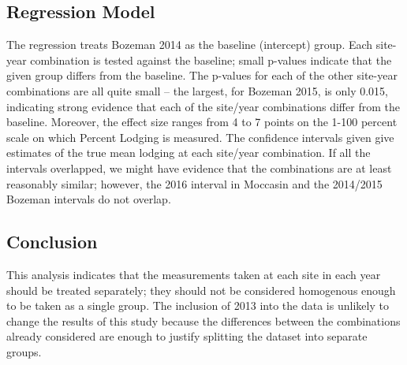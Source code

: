 \documentclass[11pt]{article}\usepackage[]{graphicx}\usepackage[]{color}
\makeatletter
\newenvironment{kframe}{%
 \def\at@end@of@kframe{}%
 \ifinner\ifhmode%
  \def\at@end@of@kframe{\end{minipage}}%
  \begin{minipage}{\columnwidth}%
 \fi\fi%
 \def\FrameCommand##1{\hskip\@totalleftmargin \hskip-\fboxsep
 \colorbox{shadecolor}{##1}\hskip-\fboxsep
     \hskip-\linewidth \hskip-\@totalleftmargin \hskip\columnwidth}%
 \MakeFramed {\advance\hsize-\width
   \@totalleftmargin\z@ \linewidth\hsize
   \@setminipage}}%
 {\par\unskip\endMakeFramed%
 \at@end@of@kframe}
\newenvironment{knitrout}{}{} %
\makeatother
\begin{document}
\subsection{Regression Model}
  The regression treats Bozeman 2014 as the baseline (intercept) group. Each site-year combination is tested against the   baseline; small p-values indicate that the given group differs from the baseline. The p-values for each of the other site-year combinations are all quite small – the largest, for Bozeman 2015, is only 0.015, indicating strong evidence that each of the site/year combinations differ from the baseline. Moreover, the effect size ranges from 4 to 7 points on the 1-100 percent scale on which Percent Lodging is measured.  The confidence intervals given give estimates of the true mean lodging at each site/year combination. If all the intervals overlapped, we might have evidence that the combinations are at least reasonably similar; however, the 2016 interval in Moccasin and the 2014/2015 Bozeman intervals do not overlap. 



\begin{knitrout}\footnotesize
{}\color{fgcolor}\begin{kframe}


{\ttfamily\noindent\bfseries{}}

{\ttfamily\noindent\bfseries{}}\end{kframe}
\end{knitrout}
\subsection{Conclusion}
This analysis indicates that the measurements taken at each site in each year should be treated separately; they should not be considered homogenous enough to be taken as a single group.  The inclusion of 2013 into the data is unlikely to change the results of this study because the differences between the combinations already considered are enough to justify splitting the dataset into separate groups. 
\end{document}
